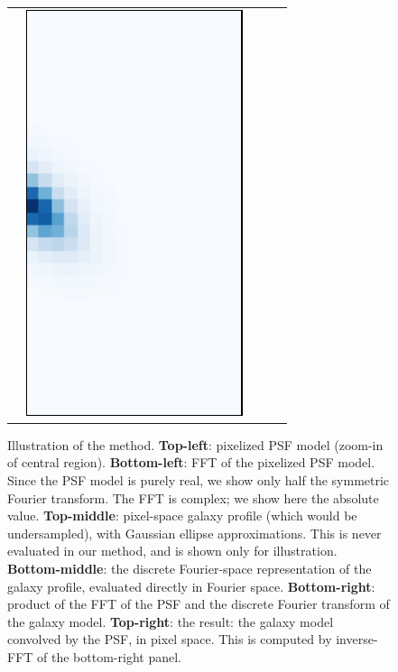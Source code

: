 \documentclass[11pt,preprint]{aastex}
\newcommand{\trick}{method}
\begin{document}
\begin{figure}
\begin{center}
\begin{tabular}{@{}c@{}c@{}c@{}c@{}c@{}}
      &
      \multicolumn{1}{r}{%
        \includegraphics[height=0.22\textwidth]{psf-03}}
    \end{tabular}
  \end{center}
  \caption{\label{fig:example}%
    Illustration of the \trick.
    \textbf{Top-left}: pixelized PSF model (zoom-in of central region).
    \textbf{Bottom-left}: FFT of the pixelized PSF model.  Since the PSF model is
    purely real, we show only half the symmetric Fourier transform. The FFT is
    complex; we show here the absolute value.
    \textbf{Top-middle}: pixel-space galaxy profile (which would be
    undersampled), with Gaussian ellipse approximations.  This is
    never evaluated in our method, and is shown only for illustration.
    \textbf{Bottom-middle}: the discrete Fourier-space representation of the
    galaxy profile, evaluated directly in Fourier space.
    \textbf{Bottom-right}: product of the FFT of the PSF and the
    discrete Fourier transform of the galaxy model.
    \textbf{Top-right}: the result: the galaxy model convolved by the
    PSF, in pixel space.  This is computed by inverse-FFT of the
    bottom-right panel.
  }
\end{figure}



\end{document}
